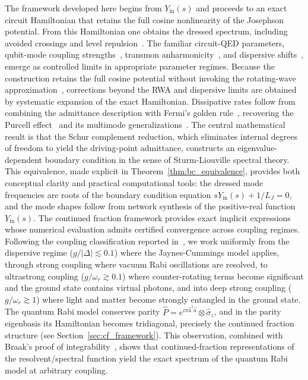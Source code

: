 \documentclass[reprint, floatfix, superscriptaddress, amsmath, amssymb, longbibliography]{revtex4-2}
\newcommand{\Yin}{Y_{\mathrm{in}}}
\begin{document}
The framework developed here begins from $\Yin(s)$ and proceeds to an exact circuit Hamiltonian that retains the full cosine nonlinearity of the Josephson potential. From this Hamiltonian one obtains the dressed spectrum, including avoided crossings and level repulsion~\cite{JaynesCummings1963, CohenTannoudji1992}. The familiar circuit-QED parameters, qubit-mode coupling strengths~\cite{Blais2004, Wallraff2004}, transmon anharmonicity~\cite{Koch2007}, and dispersive shifts~\cite{Schuster2005, Boissonneault2009}, emerge as controlled limits in appropriate parameter regimes. Because the construction retains the full cosine potential without invoking the rotating-wave approximation~\cite{Kockum2019, Blais2021}, corrections beyond the RWA and dispersive limits are obtained by systematic expansion of the exact Hamiltonian. Dissipative rates follow from combining the admittance description with Fermi's golden rule~\cite{Dirac1927, Fermi1950}, recovering the Purcell effect~\cite{Purcell1946} and its multimode generalizations~\cite{Houck2008, Clerk2010, BakrPurcell2025}. The central mathematical result is that the Schur complement reduction, which eliminates internal degrees of freedom to yield the driving-point admittance, constructs an eigenvalue-dependent boundary condition in the sense of Sturm-Liouville spectral theory. This equivalence, made explicit in Theorem~\ref{thm:bc_equivalence}, provides both conceptual clarity and practical computational tools: the dressed mode frequencies are roots of the boundary condition equation $s\Yin(s) + 1/L_J = 0$, and the mode shapes follow from network synthesis of the positive-real function $\Yin(s)$. The continued fraction framework provides exact implicit expressions whose numerical evaluation admits certified convergence across coupling regimes. Following the coupling classification reported in~\cite{Kockum2019}, we work uniformly from the dispersive regime ($g/|\Delta| \lesssim 0.1$) where the Jaynes-Cummings model applies, through strong coupling where vacuum Rabi oscillations are resolved, to ultrastrong coupling ($g/\omega_r \gtrsim 0.1$) where counter-rotating terms become significant and the ground state contains virtual photons, and into deep strong coupling ($g/\omega_r \gtrsim 1$) where light and matter become strongly entangled in the ground state. The quantum Rabi model conserves parity $\hat{P} = e^{i\pi \hat{a}^\dagger \hat{a}} \otimes \hat{\sigma}_z$, and in the parity eigenbasis its Hamiltonian becomes tridiagonal, precisely the continued fraction structure (see Section~\ref{sec:cf_framework}). This observation, combined with Braak's proof of integrability~\cite{Braak2011}, shows that continued-fraction representations of the resolvent/spectral function yield the exact spectrum of the quantum Rabi model at arbitrary coupling.
\end{document}
